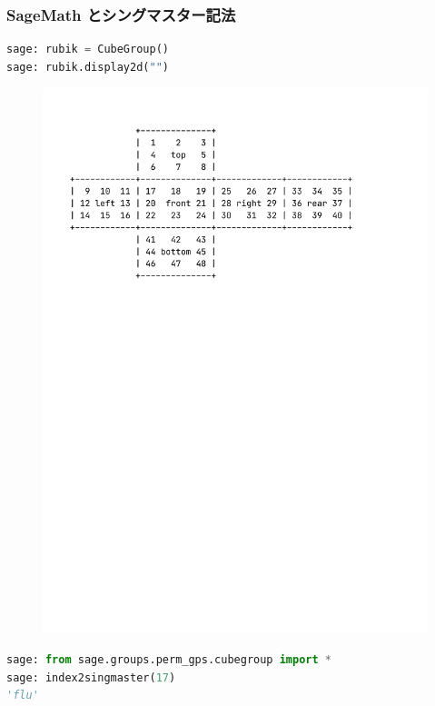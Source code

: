 \documentclass{beamer}
\begin{document}
\begin{frame}[fragile]
    \frametitle{SageMath とシングマスター記法}

    \begin{lstlisting}[language=Python]
sage: rubik = CubeGroup()
sage: rubik.display2d("")
    \end{lstlisting}

    \begin{figure}
        \includegraphics[scale=0.3]{images/display2d.pdf}
    \end{figure}

    \begin{lstlisting}[language=Python]
sage: from sage.groups.perm_gps.cubegroup import *
sage: index2singmaster(17)
'flu'
    \end{lstlisting}

\end{frame}
\end{document}
